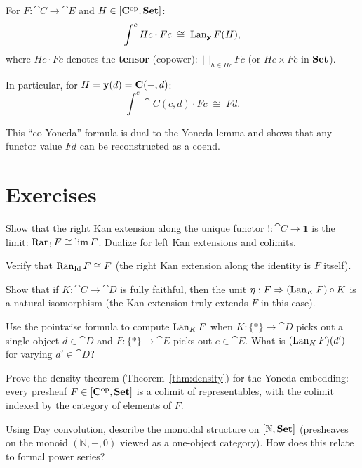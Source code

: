 \begin{theorem}
For $F: \cat{C} \to \cat{E}$ and $H \in [\mathbf{C}^{\mathrm{op}}, \mathbf{Set}]$:
\[
  \int^c Hc \cdot Fc \;\cong\; \operatorname{Lan}_{\mathbf{y}} F (H),
\]
where $Hc \cdot Fc$ denotes the \textbf{tensor} (copower): $\bigsqcup_{h \in Hc} Fc$ (or $Hc \times Fc$ in $\mathbf{Set}$).

In particular, for $H = \mathbf{y}(d) = \mathbf{C}(-, d)$:
\[
  \int^c \cat{C}(c, d) \cdot Fc \;\cong\; Fd.
\]
\end{theorem}

This ``co-Yoneda'' formula is dual to the Yoneda lemma and shows that any functor value $Fd$ can be reconstructed as a coend.

\section{Exercises}

\begin{exercise}
Show that the right Kan extension along the unique functor $!: \cat{C} \to \mathbf{1}$ is the limit: $\operatorname{Ran}_! F \cong \lim F$. Dualize for left Kan extensions and colimits.
\end{exercise}

\begin{exercise}
Verify that $\operatorname{Ran}_{\mathrm{Id}} F \cong F$ (the right Kan extension along the identity is $F$ itself).
\end{exercise}

\begin{exercise}
Show that if $K: \cat{C} \to \cat{D}$ is fully faithful, then the unit $\eta: F \Rightarrow (\operatorname{Lan}_K F) \circ K$ is a natural isomorphism (the Kan extension truly extends $F$ in this case).
\end{exercise}

\begin{exercise}
Use the pointwise formula to compute $\operatorname{Lan}_K F$ when $K: \{*\} \to \cat{D}$ picks out a single object $d \in \cat{D}$ and $F: \{*\} \to \cat{E}$ picks out $e \in \cat{E}$. What is $(\operatorname{Lan}_K F)(d')$ for varying $d' \in \cat{D}$?
\end{exercise}

\begin{exercise}[$\star$]
Prove the density theorem (Theorem~\ref{thm:density}) for the Yoneda embedding: every presheaf $F \in [\mathbf{C}^{\mathrm{op}},\mathbf{Set}]$ is a colimit of representables, with the colimit indexed by the category of elements of $F$.
\end{exercise}

\begin{exercise}[$\star$]
Using Day convolution, describe the monoidal structure on $[\mathbb{N}, \mathbf{Set}]$ (presheaves on the monoid $(\mathbb{N}, +, 0)$ viewed as a one-object category). How does this relate to formal power series?
\end{exercise}

